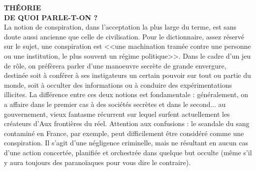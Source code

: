 \documentclass[11pt,twoside,a4paper]{article}
\begin{document}
\begin{multicols*}{2}

\textbf{\Large TH{\'E}ORIE}~\\

\textbf{\large DE QUOI PARLE-T-ON ?}~\\

La notion de conspiration, dans l'acceptation la plus large du terme, est sans doute aussi ancienne que celle de civilisation. Pour le dictionnaire, assez r{\'e}serv{\'e} sur le sujet, une conspiration est <<une machination tram{\'e}e contre une personne ou une institution, le plus souvent un r{\'e}gime politique>>. Dans le cadre d'un jeu de r{\^o}le, on pr{\'e}f{\`e}rera parler d'une manoeuvre secr{\`e}te de grande envergure, destin{\'e}e soit {\`a} conf{\'e}rer {\`a} ses instigateurs un certain pouvoir sur tout ou partie du monde, soit {\`a} occulter des informations ou {\`a} conduire des exp{\'e}rimentations illicites. La diff{\'e}rence entre ces deux notions est fondamentale : g{\'e}n{\'e}ralement, on a affaire dans le premier cas {\`a} des soci{\'e}t{\'e}s secr{\`e}tes et dans le second... au gouvernement, vieux fantasme r{\'e}current sur lequel surfent actuellement les cr{\'e}ateurs d'Aux fronti{\`e}res du r{\'e}el. Attention aux confusions : le scandale du sang contamin{\'e} en France, par exemple, peut difficilement {\^e}tre consid{\'e}r{\'e} comme une conspiration. Il s'agit d'une n{\'e}gligence criminelle, mais ne r{\'e}sultant en aucun cas d'une action concert{\'e}e, planifi{\'e}e et orchestr{\'e}e dans quelque but occulte (m{\^e}me s'il y aura toujours des parano{\"i}aques pour vous dire le contraire). ~\\


\end{multicols*}
\end{document}
